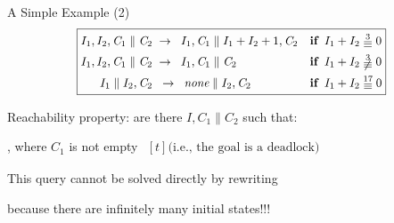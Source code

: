 \documentclass[11pt]{beamer}
\begin{document}
\begin{frame}{A Simple Example (2)}
\[
\scalebox{0.95}{
\boxed{
\begin{aligned}
I_1, I_2, \mathit{C}_1 \parallel \mathit{C}_2 &\;\rews \;\;I_1,\mathit{C}_1 \parallel I_1 + I_2 + 1, \mathit{C}_2  && \textbf{if} \;\;   I_1 + I_2 \;\raisebox{-0.5ex}{\ensuremath{\stackrel{3}{\equiv}}}\; 0 \\
I_1,I_2,\mathit{C}_1 \parallel \mathit{C}_2 &\;\rews\;\;I_1,\mathit{C}_1 \parallel \mathit{C}_2 \quad && \textbf{if} \;\;  I_1 + I_2 \;\raisebox{-0.5ex}{\ensuremath{\not\stackrel{3}{\equiv}}}\; 0 \\
I_1 \parallel I_2,\mathit{C}_2 &\;\;\rews\;\;\textit{none} \parallel I_2,\mathit{C}_2 \quad && \textbf{if}\;\; I_1 + I_2 \;\raisebox{-0.5ex}{\ensuremath{\stackrel{17}{\equiv}}}\; 0
\end{aligned}
}
}
\]
    
\begin{outeritemize}
    \item \alert{Reachability property}: are there $I, \mathit{C}_1 \parallel \mathit{C}_2$ such that:
    
    \vspace{1ex}
    \begin{description}\small\addtolength{\itemsep}{0.2\baselineskip}
        \item[initial pattern:] 
        \item[goal:] , where $\mathit{C}_1$ is not empty
        $\begin{aligned}[t]
        \mbox{(i.e., the goal is a deadlock)}
        \end{aligned}$
    \end{description}

    \pause
    \item This query cannot be solved directly by rewriting
    
    \begin{inneritemize}
        \item because there are infinitely many initial states!!!
    \end{inneritemize}
\end{outeritemize}
\end{frame}
\end{document}
